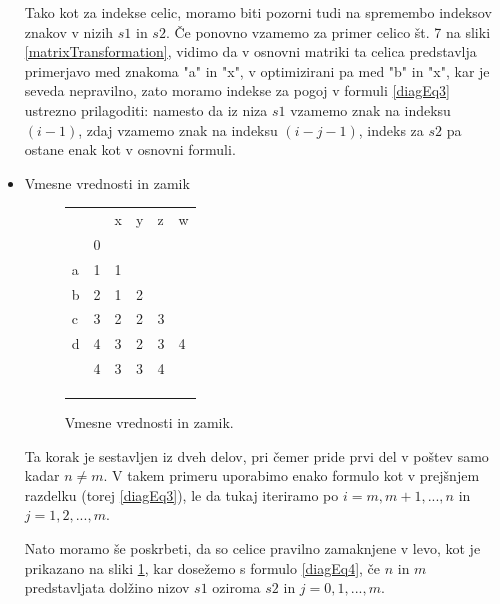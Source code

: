 \documentclass[a4paper,12pt,openright]{book}
\begin{document}
\begin{itemize}
Tako kot za indekse celic, moramo biti pozorni tudi na spremembo indeksov znakov v nizih $s1$ in $s2$. Če ponovno vzamemo za primer celico št. 7 na sliki \ref{matrixTransformation}, vidimo da v osnovni matriki ta celica predstavlja primerjavo med znakoma "a" in "x", v optimizirani pa med "b" in "x", kar je seveda nepravilno, zato moramo indekse za pogoj v formuli \ref{diagEq3} ustrezno prilagoditi: namesto da iz niza $s1$ vzamemo znak na indeksu $(i-1)$, zdaj vzamemo znak na indeksu $(i-j-1)$, indeks za $s2$ pa ostane enak kot v osnovni formuli. 

    \item Vmesne vrednosti in zamik
    
\begin{figure}[htb]
\centering
\begin{tabular}{|l|l|l|l|l|l|}
\cline{3-6}
\multicolumn{2}{c|}{} & x & y & z & w \\ \cline{2-6}
\multicolumn{1}{c|}{} & 0 & \multicolumn{4}{c}{} \\ \cline{1-3}
a  & 1 & 1 & \multicolumn{3}{c}{} \\ \cline{1-4}
b  & 2 & 1 & 2 & \multicolumn{2}{c}{} \\ \cline{1-5}
c  & 3 & 2 & 2 & 3 & \multicolumn{1}{c}{} \\ \cline{1-6}
d  & 4 & 3 & 2 & 3 & 4 \\ \hline
 \multicolumn{1}{c|}{} & \cellcolor{blue!15}4 & \cellcolor{blue!15}3 & \cellcolor{blue!15}3 & \cellcolor{blue!15}4 & \multicolumn{1}{c}{} \\ \cline{2-5}
\multicolumn{1}{c|}{} & & & & \multicolumn{2}{c}{} \\ \cline{2-4}
\multicolumn{1}{c|}{} & & & \multicolumn{3}{c}{} \\ \cline{2-3}
\multicolumn{1}{c|}{} & & \multicolumn{4}{c}{} \\ \cline{2-2}
\end{tabular}
\caption{Vmesne vrednosti in zamik.}
\label{diagMemory3}
\end{figure}

Ta korak je sestavljen iz dveh delov, pri čemer pride prvi del v poštev samo kadar $n \neq m$. V takem primeru uporabimo enako formulo kot v prejšnjem razdelku (torej \ref{diagEq3}), le da tukaj iteriramo po $i=m,m+1,...,n$ in $j=1,2,...,m$. 

Nato moramo še poskrbeti, da so celice pravilno zamaknjene v levo, kot je prikazano na sliki \ref{diagMemory3}, kar dosežemo s formulo \ref{diagEq4}, če $n$ in $m$ predstavljata dolžino nizov $s1$ oziroma $s2$ in $j=0,1,...,m$.


\end{itemize}
\end{document}
